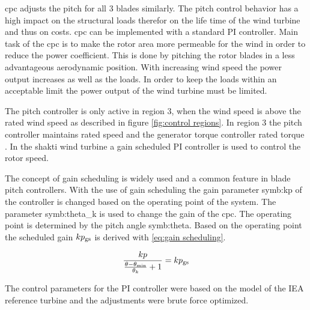 \gls{cpc} adjusts the pitch for all 3 blades similarly.
The pitch control behavior has a high impact on the structural loads therefor on the life time of the wind turbine and thus on costs.
\gls{cpc} can be implemented with a standard PI controller.
Main task of the \gls{cpc} is to make the rotor area more permeable for the wind in order to reduce the power coefficient.
This is done by pitching the rotor blades in a less advantageous aerodynamic position.
With increasing wind speed the power output increases as well as the loads.
In order to keep the loads within an acceptable limit the power output of the wind turbine must be limited.

The pitch controller is only active in region 3, when the wind speed is above the rated wind speed as described in figure \ref{fig:control regions}.
In region 3 the pitch controller maintains rated speed and the generator torque controller rated torque \cite{SchlipfLecture}. 
In the \gls{shakti} wind turbine a gain scheduled PI controller is used to control the rotor speed. 

The concept of gain scheduling is widely used and a common feature in blade pitch controllers.
With the use of gain scheduling the gain parameter \gls{symb:kp} of the controller is changed based on the operating point of the system.
The parameter \gls{symb:theta_k} is used to change the gain of the \gls{cpc}.
The operating point is determined by the pitch angle \gls{symb:theta}. Based on the operating point the scheduled gain $kp_\textnormal{gs}$ is derived with \ref{eq:gain scheduling}.

\begin{equation}
	\frac{kp}{\frac{\theta - \theta_\textnormal{min}}{\theta_k} + 1} = kp_\textnormal{gs}
	\label{eq:gain scheduling}
\end{equation}

The control parameters for the PI controller were based on the model of the IEA reference turbine \cite{IEA} and the adjustments were brute force optimized.